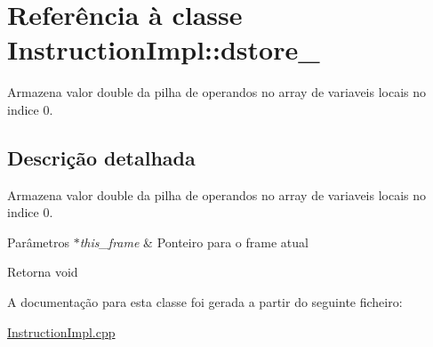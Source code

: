 \hypertarget{class_instruction_impl_1_1dstore__0}{}\section{Referência à classe Instruction\+Impl\+:\+:dstore\+\_}
\label{class_instruction_impl_1_1dstore__0}


Armazena valor double da pilha de operandos no array de variaveis locais no indice 0.  




\subsection{Descrição detalhada}
Armazena valor double da pilha de operandos no array de variaveis locais no indice 0. 


\begin{DoxyParams}{Parâmetros}
{\em $\ast$this\+\_\+frame} & Ponteiro para o frame atual \\
\hline
\end{DoxyParams}
\begin{DoxyReturn}{Retorna}
void 
\end{DoxyReturn}


A documentação para esta classe foi gerada a partir do seguinte ficheiro\+:\begin{DoxyCompactItemize}
\item 
\hyperlink{_instruction_impl_8cpp}{Instruction\+Impl.\+cpp}\end{DoxyCompactItemize}
